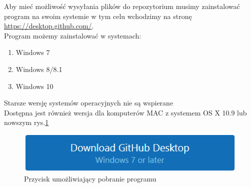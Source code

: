 Aby mieć możliwość wysyłania plików do repozytorium musimy zainstalować program na swoim systemie w tym celu wchodzimy na stronę \href{https://desktop.github.com/}{https://desktop.github.com/}.\\ Program możemy zainstalować w systemach:
\begin{enumerate}
\item Windows 7
\item Windows 8/8.1
\item Windows 10
\end{enumerate}
Starsze wersję systemów operacyjnych nie są wspierane\\
Dostępna jest również wersja dla komputerów MAC z systemem OS X 10.9 lub nowszym rys.\ref{fig:gitdownload}
\begin{figure}[H]
	\centering
	\includegraphics{fig/gitdownload}
	\caption{Przycisk umożliwiający pobranie programu}
	\label {fig:gitdownload} 
\end{figure}

